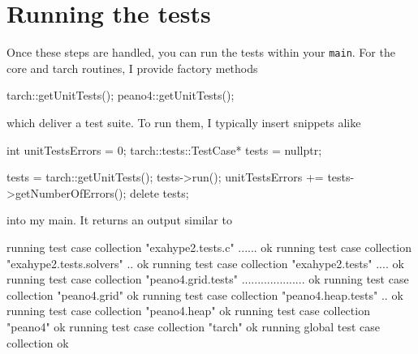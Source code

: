 \section{Running the tests}
Once these steps are handled, you can run the tests within your \texttt{main}.
For the core and tarch routines, I provide factory methods  

\begin{code}
tarch::getUnitTests();
peano4::getUnitTests();
\end{code}

\noindent
which deliver a test suite. To run them, I typically insert snippets alike
\begin{code}
  int unitTestsErrors = 0;
  tarch::tests::TestCase* tests = nullptr;

  tests = tarch::getUnitTests();
  tests->run();
  unitTestsErrors += tests->getNumberOfErrors();
  delete tests;
\end{code}

\noindent
into my main.
It returns an output similar to
\begin{code}
running test case collection "exahype2.tests.c" ...... ok                                                                                                                
running test case collection "exahype2.tests.solvers" .. ok                                                                                                              
running test case collection "exahype2.tests" .... ok                                                                                                                    
running test case collection "peano4.grid.tests" .................... ok                                                                                                 
running test case collection "peano4.grid"  ok                                                                                                                           
running test case collection "peano4.heap.tests" .. ok                                                                                                                   
running test case collection "peano4.heap"  ok                                                                                                                           
running test case collection "peano4"  ok                                                                                                                                
running test case collection "tarch"  ok                                                                                                                                
running global test case collection  ok                                                                                                                                 
\end{code}

